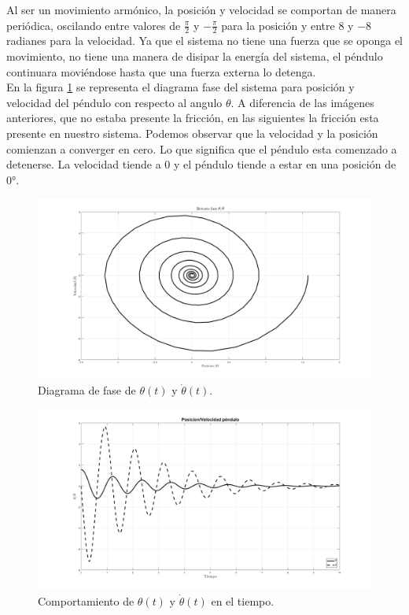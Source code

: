 Al ser un movimiento armónico, la posición y velocidad se comportan de manera periódica, oscilando entre valores de $\frac{\pi}{2}$ y $-\frac{\pi}{2}$ para la posición y entre $8$ y $-8$ radianes para la velocidad. Ya que el sistema no tiene una fuerza que se oponga el movimiento, no tiene una manera de disipar la energía del sistema, el péndulo continuara moviéndose hasta que una fuerza externa lo detenga.\\


En la figura \ref{fig: phase plot - F} se representa el diagrama fase del sistema para posición y velocidad del péndulo con respecto al angulo $\theta$. A diferencia de las imágenes anteriores, que no estaba presente la fricción, en las siguientes la fricción esta presente en nuestro sistema. Podemos observar que la velocidad y la posición comienzan a converger en cero. Lo que significa que el péndulo esta comenzado a detenerse. La velocidad tiende a $0$ y el péndulo tiende a estar en una posición de $0°$.

\begin{figure}[hb]
 \centering 
 \includegraphics[scale=0.35]{./img/faseF.png}
\caption{Diagrama de fase de $\theta(t)$ y $\dot{\theta}(t)$.}
 \label{fig: phase plot - F}
\end{figure}




\begin{figure}[hb]
 \centering 
 \includegraphics[scale=0.35]{./img/PosVelF.png}
 \caption{Comportamiento de $\theta(t)$ y $\dot{\theta}(t)$ en el tiempo.}
 \label{fig: time plot - F}
\end{figure}



